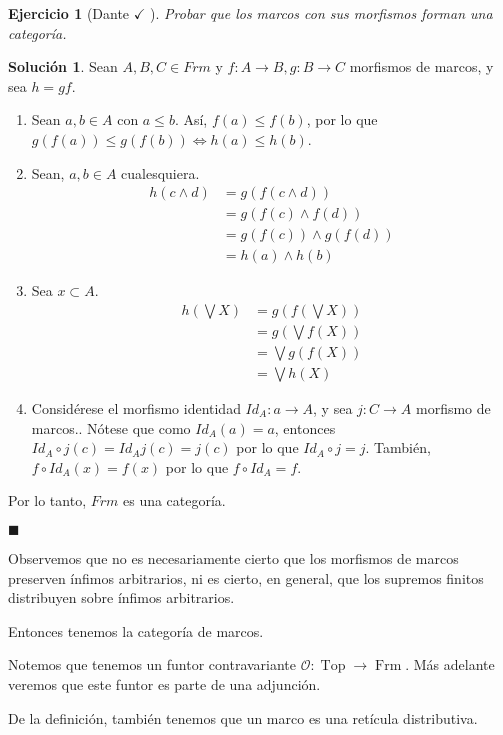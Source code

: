 \documentclass[12pt,letterpaper,titlepage]{article}
\newtheorem{exe}{Ejercicio}
\theoremstyle{definition}
\newtheorem*{sol}{Solución}
\newcommand\Sup{\bigvee}
\renewcommand\inf{\wedge}
\newcommand\scr[1]{\mathscr{#1}}
\newcommand\<{\langle}
\renewcommand\>{\rangle}
\DeclareMathOperator{\Frm}{Frm}
\DeclareMathOperator{\Top}{Top}
\begin{document}
\begin{exe}[Dante $\checkmark$ ]
  Probar que los marcos con sus morfismos forman una categoría.
\end{exe}
\begin{sol}
    Sean $A,B,C\in Frm$ y $f:A\to B, g:B\to C$ morfismos de marcos, y sea $h=gf$.
    \begin{enumerate}
        \item Sean $a,b\in A$ con $a\leq b$. Así, $f(a)\leq f(b)$, por lo que $g(f(a))\leq g(f(b)) \iff h(a)\leq h(b)$. 
        \item Sean, $a,b\in A$ cualesquiera. 
        \begin{align*}
        h(c\inf d)&=g(f(c\inf d))\\
        &=g(f(c)\inf f(d))\\
        &=g(f(c))\inf g(f(d))\\
        &=h(a)\inf h(b)
        \end{align*}
        \item Sea $x\subset A$. 
        \begin{align*}
            h(\Sup X)&=g(f(\Sup X))\\
            &=g(\Sup f(X))\\
            &=\Sup g(f(X))\\
            &=\Sup h(X)
        \end{align*}
        \item Considérese el morfismo identidad $Id_A:a\to A$, y sea $j:C\to A$ morfismo de marcos.. Nótese que como $Id_A(a)=a$, entonces $Id_A\circ j(c)=Id_Aj(c)=j(c)$ por lo que $Id_A\circ j=j$. También, $f\circ Id_A(x)=f(x)$ por lo que $f\circ Id_A=f$.
    \end{enumerate}
    Por lo tanto, $Frm$ es una categoría.\vspace{3mm}
    
    \hfill $\blacksquare$
\end{sol}\vspace{3mm}

Observemos que no es necesariamente cierto que los morfismos de
marcos preserven ínfimos arbitrarios, ni es cierto, en general,
que los supremos finitos distribuyen sobre ínfimos arbitrarios.

Entonces tenemos la categoría de marcos.

Notemos que tenemos un funtor contravariante $\scr O:\Top\to\Frm$.
Más adelante veremos que este funtor es parte de una adjunción.

De la definición, también tenemos que un marco es una retícula
distributiva.
\end{document}
